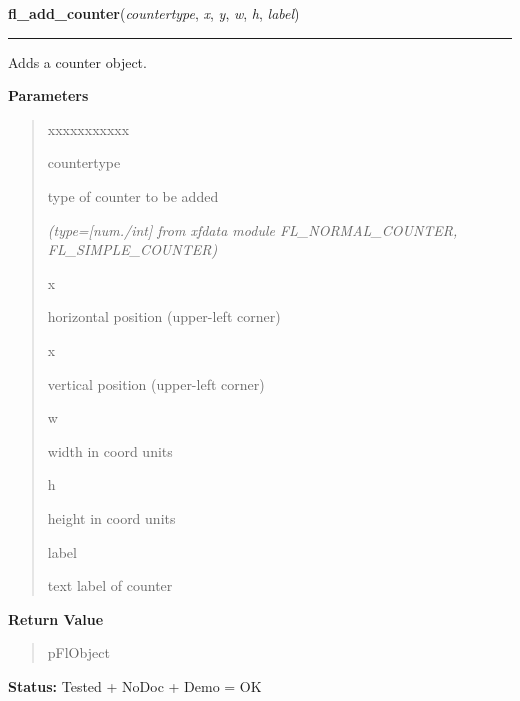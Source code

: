     \vspace{0.5ex}

\hspace{.8\funcindent}\begin{boxedminipage}{\funcwidth}

    \raggedright \textbf{fl\_add\_counter}(\textit{countertype}, \textit{x}, \textit{y}, \textit{w}, \textit{h}, \textit{label})

    \vspace{-1.5ex}

    \rule{\textwidth}{0.5\fboxrule}
\setlength{\parskip}{2ex}
    Adds a counter object.

\setlength{\parskip}{1ex}
      \textbf{Parameters}
      \vspace{-1ex}

      \begin{quote}
        \begin{Ventry}{xxxxxxxxxxx}

          \item[countertype]

          type of counter to be added

            {\it (type=[num./int] from xfdata module FL\_NORMAL\_COUNTER, FL\_SIMPLE\_COUNTER)}

          \item[x]

          horizontal position (upper-left corner)

          \item[x]

          vertical position (upper-left corner)

          \item[w]

          width in coord units

          \item[h]

          height in coord units

          \item[label]

          text label of counter

        \end{Ventry}

      \end{quote}

      \textbf{Return Value}
    \vspace{-1ex}

      \begin{quote}
      pFlObject

      \end{quote}

\textbf{Status:} Tested + NoDoc + Demo = OK



    \end{boxedminipage}

